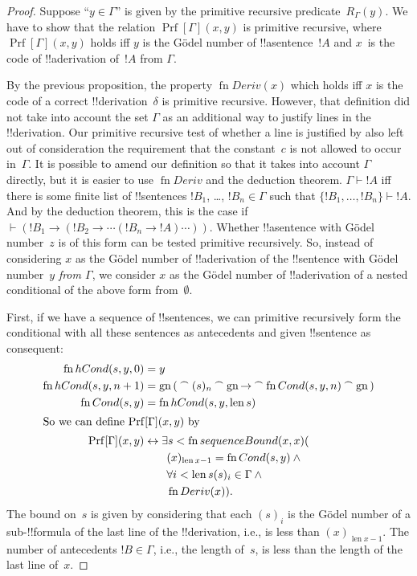 \documentclass[10pt,a4paper]{article}
\theoremstyle{plain}
\theoremstyle{definition}
\theoremstyle{remark}
\providecommand{\lif}{\mathbin{\rightarrow}}
\providecommand{\Proves}{\mathrel{\vdash}}
\providecommand{\len}{\operatorname{len}}
\providecommand{\concat}{\mathbin{{}^\frown}}
\providecommand{\Prf}{\operatorname{Prf}}
\providecommand{\Gn}{\operatorname{gn}}
\providecommand{\bforall}{\forall}
\providecommand{\bexists}{\exists}
\providecommand{\QR}{\mathrm{QR}}
\providecommand{\defiff}{\mathrel{\leftrightarrow}}
\providecommand{\fn}{\operatorname{fn}}
\begin{document}
\begin{proof}
Suppose ``$y \in \Gamma$'' is given by the primitive recursive
predicate~$R_\Gamma(y)$.  We have to show that the relation
$\Prf[\Gamma](x, y)$ is primitive recursive, where $\Prf[\Gamma](x,
y)$ holds iff $y$ is the G\"odel number of !!a{sentence}~$!A$ and
$x$~is the code of !!a{derivation} of~$!A$ from $\Gamma$.

By the previous proposition, the property $\fn{Deriv}(x)$ which holds
iff $x$ is the code of a correct !!{derivation}~$\delta$ is primitive
recursive. However, that definition did not take into account the set
$\Gamma$ as an additional way to justify lines in the !!{derivation}. Our
primitive recursive test of whether a line is justified by \QR{} also
left out of consideration the requirement that the constant~$c$ is not
allowed to occur in~$\Gamma$. It is possible to amend our definition so
that it takes into account $\Gamma$ directly, but it is easier to use
$\fn{Deriv}$ and the deduction theorem. $\Gamma \Proves !A$ iff
there is some finite list of !!{sentence}s $!B_1$, \dots, $!B_n \in
\Gamma$ such that $\{!B_1, \dots, !B_n\} \Proves !A$. And by the
deduction theorem, this is the case if $\Proves (!B_1 \lif (!B_2 \lif
\cdots (!B_n \lif !A)\cdots))$. Whether !!a{sentence} with G\"odel
number~$z$ is of this form can be tested primitive recursively.  So,
instead of considering $x$ as the G\"odel number of !!a{derivation} of
the !!{sentence} with G\"odel number~$y$ \emph{from $\Gamma$}, we consider
$x$ as the G\"odel number of !!a{derivation} of a nested conditional
of the above form from~$\emptyset$.

First, if we have a sequence of !!{sentence}s, we can primitive
recursively form the conditional with all these sentences as
antecedents and given !!{sentence} as consequent:
\begin{align*}
  \fn{hCond}(s, y, 0) & = y \\
  \fn{hCond}(s, y, n+1) & = \Gn{(} \concat (s)_{n} \concat \Gn{\lif}
  \concat \fn{Cond}(s, y, n) \concat \Gn{)}\\
  \fn{Cond}(s, y) & = \fn{hCond}(s, y, \len{s})\\
  \intertext{So we can define $\Prf[\Gamma](x, y)$ by}
  \Prf[\Gamma](x, y) & \defiff \bexists{s < \fn{sequenceBound}(x,x)}{(} \\
  &\qquad (x)_{\len{x}-1} = \fn{Cond}(s,y) \land {} \\
  &\qquad\bforall{i<\len{s}}{(s)_i \in \Gamma} \land {} \\
  &\qquad\fn{Deriv}(x)).
\end{align*}
The bound on~$s$ is given by considering that each $(s)_i$ is the
G\"odel number of a sub-!!{formula} of the last line of the !!{derivation},
i.e., is less than $(x)_{\len{x}-1}$. The number of antecedents $!B
\in \Gamma$, i.e., the length of~$s$, is less than the length of the
last line of~$x$.
\end{proof}
\end{document}
